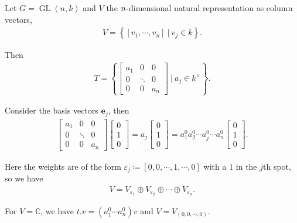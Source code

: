\begin{example}

Let \(G = \operatorname{GL}(n, k)\) and \(V\) the
\(n{\hbox{-}}\)dimensional natural representation as column vectors,
\begin{align*}  
V = \left\{{{\left[ {v_1, \cdots, v_n} \right]} {~\mathrel{\Big|}~}v_j \in k}\right\}
.\end{align*}

Then
\begin{align*}  
T = \left\{{
\begin{bmatrix}
a_1 & 0 & 0 \\
0 & \ddots & 0\\
0 & 0 & a_n
\end{bmatrix} {~\mathrel{\Big|}~}a_j \in k^{\times}
}\right\}
.\end{align*}

Consider the basis vectors \(\mathbf{e}_j\), then
\begin{align*}  
\begin{bmatrix}
a_1 & 0 & 0 \\
0 & \ddots & 0\\
0 & 0 & a_n
\end{bmatrix} 
\begin{bmatrix}
0  \\
1  \\
0
\end{bmatrix}
=
a_j
\begin{bmatrix}
0  \\
1 \\
0
\end{bmatrix}
= a_1^0 a_2^0 \cdots a_j^0 \cdots a_n^0
\begin{bmatrix}
0  \\
1 \\
0
\end{bmatrix}
.\end{align*}

Here the weights are of the form
\(\varepsilon_j\coloneqq{\left[ {0, 0, \cdots, 1, \cdots, 0} \right]}\)
with a \(1\) in the \(j\)th spot, so we have
\begin{align*}  
V = V_{\varepsilon_1} \oplus V_{\varepsilon_2} \oplus \cdots \oplus V_{{\varepsilon_n}}
.\end{align*}

\end{example}

\begin{example}

For \(V = {\mathbb{C}}\), we have \(t.v = (a_1^0 \cdots a_n^0)v\) and
\(V = V_{(0, 0, \cdots, 0)}\).

\end{example}

